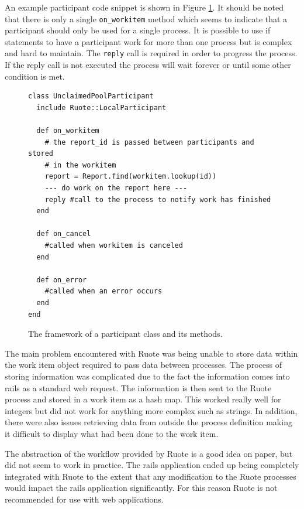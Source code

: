 \documentclass[document.tex]{subfiles}
\begin{document}
An example participant code snippet is shown in Figure \ref{fig:ruote-prototype-participant-code}. It should be noted that there is only a single \verb!on_workitem! method which seems to indicate that a participant should only be used for a single process. It is possible to use if statements to have a participant work for more than one process but is complex and hard to maintain. The \verb!reply! call is required in order to progress the process. If the reply call is not executed the process will wait forever or until some other condition is met.

\begin{figure}[!ht]
  \begin{lstlisting}
class UnclaimedPoolParticipant
  include Ruote::LocalParticipant

  def on_workitem
    # the report_id is passed between participants and stored
    # in the workitem
    report = Report.find(workitem.lookup(id))
    --- do work on the report here ---
    reply #call to the process to notify work has finished
  end

  def on_cancel
    #called when workitem is canceled
  end

  def on_error
    #called when an error occurs
  end
end
  \end{lstlisting}
  \caption{The framework of a participant class and its methods.}
  \label{fig:ruote-prototype-participant-code}
\end{figure}

The main problem encountered with Ruote was being unable to store data within the work item object required to pass data between processes. The process of storing information was complicated due to the fact the information comes into rails as a standard web request. The information is then sent to the Ruote process and stored in a work item as a hash map. This worked really well for integers but did not work for anything more complex such as strings. In addition, there were also issues retrieving data from outside the process definition making it difficult to display what had been done to the work item.

The abstraction of the workflow provided by Ruote is a good idea on paper, but did not seem to work in practice. The rails application ended up being completely integrated with Ruote to the extent that any modification to the Ruote processes would impact the rails application significantly. For this reason Ruote is not recommended for use with web applications.


\FloatBarrier
\end{document}
